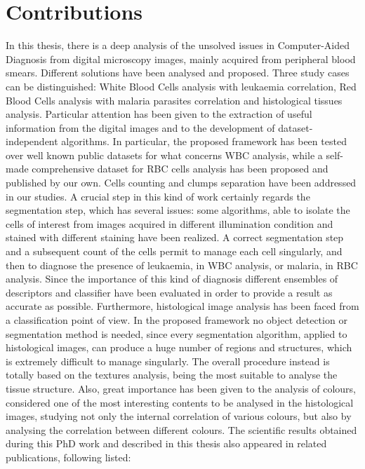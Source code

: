 \documentclass[final,a4paper,12pt,english]{UnicaPhdThesis3}
\begin{document}
\section{Contributions} %
In this thesis, there is a deep analysis of the unsolved issues in Computer-Aided Diagnosis from digital microscopy images, mainly acquired from peripheral blood smears. Different solutions have been analysed and proposed. Three study cases can be distinguished: White Blood Cells analysis with leukaemia correlation, Red Blood Cells analysis with malaria parasites correlation and histological tissues analysis. Particular attention has been given to the extraction of useful information from the digital images and to the development of dataset-independent algorithms. In particular, the proposed framework has been tested over well known public datasets for what concerns WBC analysis, while a self-made comprehensive dataset for RBC cells analysis has been proposed and published by our own. Cells counting and clumps separation have been addressed in our studies. A crucial step in this kind of work certainly regards the segmentation step, which has several issues: some algorithms, able to isolate the cells of interest from images acquired in different illumination condition and stained with different staining have been realized. A correct segmentation step and a subsequent count of the cells permit to manage each cell singularly, and then to diagnose the presence of leukaemia, in WBC analysis, or malaria, in RBC analysis. Since the importance of this kind of diagnosis different ensembles of descriptors and classifier have been evaluated in order to provide a result as accurate as possible. Furthermore, histological image analysis has been faced from a classification point of view. In the proposed framework no object detection or segmentation method is needed, since every segmentation algorithm, applied to histological images, can produce a huge number of regions and structures, which is extremely difficult to manage singularly. The overall procedure instead is totally based on the textures analysis, being the most suitable to analyse the tissue structure. Also, great importance has been given to the analysis of colours, considered one of the most interesting contents to be analysed in the histological images, studying not only the internal correlation of various colours, but also by analysing the correlation between different colours.
The scientific results obtained during this PhD work and described in this thesis also appeared in related publications, following listed:
\end{document}
